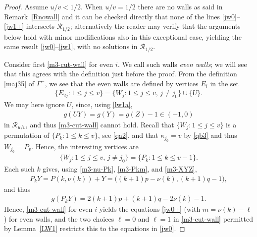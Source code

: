\documentclass[11pt,reqno,tbtags,a4paper]{amsart}
\numberwithin{equation}{section}
\renewcommand\le{\leq}
\renewcommand\leq{\leqslant}
\theoremstyle{plain}%
\theoremstyle{definition}
\theoremstyle{remark}
\newcommand{\refL}[1]{Lemma~\ref{#1}}
\newcommand{\refR}[1]{Remark~\ref{#1}}
\newcommand\set[1]{\ensuremath{\{#1\}}}
\newcommand\bigpar[1]{\bigl(#1\bigr)}
\newcommand\gG{\Gamma}
\newcommand\kk{\kappa}
\newcommand\cR{{\mathcal R}}
\newcommand\0{{\boldsymbol 0}}
\newcommand\1{{\boldsymbol 1}}
\begin{document}
\begin{proof}
Assume $u/v< 1/2$.
When $u/v=1/2$ there are no walls as said in \refR{Rnowall} and it can
be checked directly
that none of the lines \eqref{jw0}--\eqref{jw1+} intersects $\cR_{1/2}$;
alternatively the reader may verify that the arguments below hold with minor
modifications also in this exceptional case, yielding the same result
\eqref{jw0}--\eqref{jw1}, with no solutions in $\cR_{1/2}$.

Consider first \eqref{m3-cut-wall} for even $i$.
We call such walls \emph{even walls}; we will see that this agrees with
the definition just before the proof.
From the definition \eqref{maj35} of $\gG^-$, we see that the even walls are
defined by vertices $E_i$ in the set
\begin{align}\label{cw1}
  \set{E_{2j}:1\le j\le v}
=  \set{W_{j}:1\le j\le v,\, j\neq j_0}\cup\set{U}.
\end{align}
We may here ignore $U$, since, 
using \eqref{lw1a},
\begin{align}\label{cw11}
g(UY)=g(Y)=g(Z)-1\in(-1,0) 
\end{align}
in $\cR_{u/v}$, 
and thus \eqref{m3-cut-wall} cannot hold.
Recall that $\set{W_j:1\le j\le v}$ is a permutation of
$\set{P_k:1\le k\le v}$, see \eqref{qa2}, and that $\kk_{j_0}=v$ by
\eqref{qb3} and thus 
$W_{j_0}=P_v$. Hence, the interesting vertices are
\begin{align}\label{cw3}
 \set{W_{j}:1\le j\le v,\, j\neq j_0}
=
 \set{P_{k}:1\le k\le v-1}.
\end{align}
Each such $k$ gives, using \eqref{m3-nu-Pk}, \eqref{m3-Pkm}, and \eqref{m3-XYZ},
\begin{align}\label{cw4}
  P_kY=P(k,\nu(k))+Y
=\bigpar{(k+1)p-\nu(k),(k+1)q-1},
\end{align}
and thus
\begin{align}\label{cw5}
 g(P_kY)=2(k+1)p +(k+1)q-2\nu(k)-1.
\end{align}
Hence, \eqref{m3-cut-wall} for even $i$ yields the equations \eqref{jw0+}
(with $m=\nu(k)-\ell$)
for even walls, and
the two choices $\ell=0$ and $\ell=1$ in \eqref{m3-cut-wall} 
permitted by \refL{LW1} restricts this to the equations in \eqref{jw0}.


\end{proof}
\end{document}
